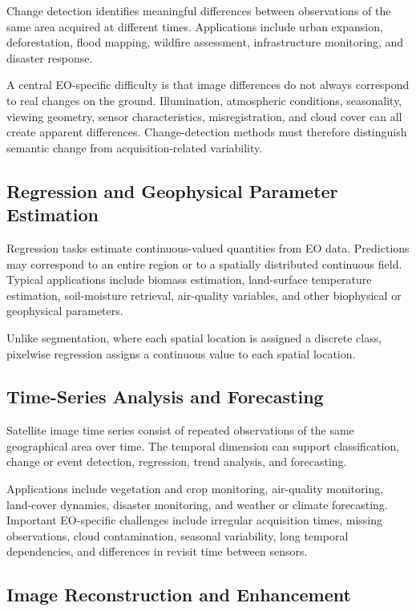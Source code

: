 \documentclass[11pt,a4paper]{article}
\begin{document}
Change detection identifies meaningful differences between observations
of the same area acquired at different times. Applications include urban
expansion, deforestation, flood mapping, wildfire assessment,
infrastructure monitoring, and disaster response.

A central EO-specific difficulty is that image differences do not always
correspond to real changes on the ground. Illumination, atmospheric
conditions, seasonality, viewing geometry, sensor characteristics,
misregistration, and cloud cover can all create apparent differences.
Change-detection methods must therefore distinguish semantic change from
acquisition-related variability.

\subsection{Regression and Geophysical Parameter Estimation}

Regression tasks estimate continuous-valued quantities from EO data.
Predictions may correspond to an entire region or to a spatially
distributed continuous field. Typical applications include biomass
estimation, land-surface temperature estimation, soil-moisture retrieval,
air-quality variables, and other biophysical or geophysical parameters.

Unlike segmentation, where each spatial location is assigned a discrete
class, pixelwise regression assigns a continuous value to each spatial
location.

\subsection{Time-Series Analysis and Forecasting}

Satellite image time series consist of repeated observations of the same
geographical area over time. The temporal dimension can support
classification, change or event detection, regression, trend analysis,
and forecasting.

Applications include vegetation and crop monitoring, air-quality
monitoring, land-cover dynamics, disaster monitoring, and weather or
climate forecasting. Important EO-specific challenges include irregular
acquisition times, missing observations, cloud contamination, seasonal
variability, long temporal dependencies, and differences in revisit time
between sensors.

\subsection{Image Reconstruction and Enhancement}
\end{document}

